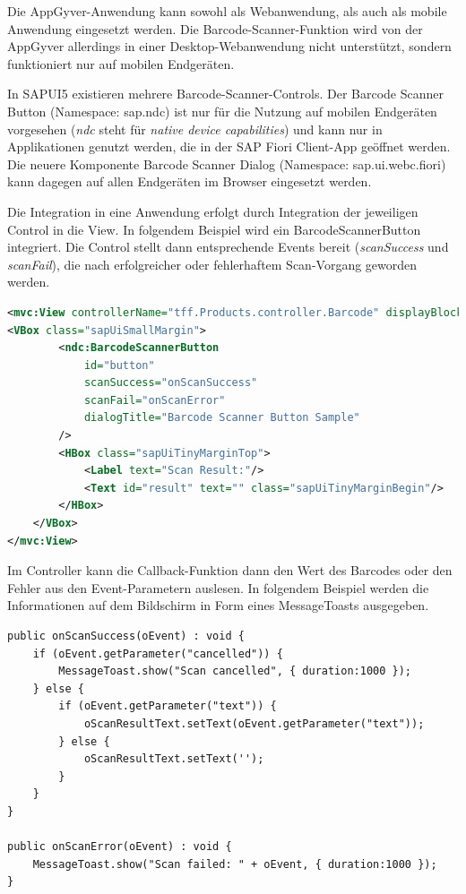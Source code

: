 Die AppGyver-Anwendung kann sowohl als Webanwendung, als auch als mobile Anwendung eingesetzt werden. Die Barcode-Scanner-Funktion wird von der AppGyver allerdings in einer Desktop-Webanwendung nicht unterstützt, sondern funktioniert nur auf mobilen Endgeräten.

In SAPUI5 existieren mehrere Barcode-Scanner-Controls.  Der Barcode Scanner Button (Namespace: sap.ndc) ist nur für die Nutzung auf mobilen Endgeräten vorgesehen (\textit{ndc} steht für \textit{native device capabilities}) und kann nur in Applikationen genutzt werden, die in der SAP Fiori Client-App geöffnet werden. Die neuere Komponente Barcode Scanner Dialog (Namespace: sap.ui.webc.fiori) kann dagegen auf allen Endgeräten im Browser eingesetzt werden.

Die Integration in eine Anwendung erfolgt durch Integration der jeweiligen Control in die View. In folgendem Beispiel wird ein BarcodeScannerButton integriert. Die Control stellt dann entsprechende Events bereit (\textit{scanSuccess} und \textit{scanFail}), die nach erfolgreicher oder fehlerhaftem Scan-Vorgang geworden werden. 
\begin{lstlisting}[language=XML,  caption=Implementierung Barcode-Scanner in View \texttt{Barcode.view.xml}]
<mvc:View controllerName="tff.Products.controller.Barcode" displayBlock="true" xmlns:ndc="sap.ndc" xmlns="sap.m" xmlns:mvc="sap.ui.core.mvc">
<VBox class="sapUiSmallMargin">
		<ndc:BarcodeScannerButton
			id="button"
			scanSuccess="onScanSuccess"
			scanFail="onScanError"
			dialogTitle="Barcode Scanner Button Sample"
		/>
		<HBox class="sapUiTinyMarginTop">
			<Label text="Scan Result:"/>
			<Text id="result" text="" class="sapUiTinyMarginBegin"/>
		</HBox>
	</VBox>
</mvc:View>
\end{lstlisting}

Im Controller kann die Callback-Funktion dann den Wert des Barcodes oder den Fehler aus den Event-Parametern auslesen. In folgendem Beispiel werden die Informationen auf dem Bildschirm in Form eines MessageToasts ausgegeben. 
\begin{lstlisting}[emph={event, cancelled, duration, text, Scan failed, Scan cancelled},  caption=Implementierung Barcode-Scanner in Controller \texttt{Barcode.control.ts}]
public onScanSuccess(oEvent) : void {
	if (oEvent.getParameter("cancelled")) {
		MessageToast.show("Scan cancelled", { duration:1000 });
	} else {
		if (oEvent.getParameter("text")) {
			oScanResultText.setText(oEvent.getParameter("text"));
		} else {
			oScanResultText.setText('');
		}
	}
}

public onScanError(oEvent) : void {
	MessageToast.show("Scan failed: " + oEvent, { duration:1000 });
}
\end{lstlisting}

